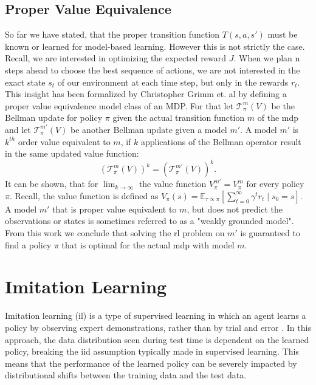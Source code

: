 \subsection{Proper Value Equivalence}
\label{sec:prop_val_eq}
So far we have stated, that the proper transition function $T(s,a,s')$ must be known or learned for model-based learning. However this is not strictly the case. Recall, we are 
interested in optimizing the expected reward $J$. When we plan n steps ahead to choose the best sequence of actions, we are not interested in the exact state $s_t$ 
of our environment at each time step, but only in the rewards $r_t$. \\
This insight has been formalized by Christopher Grimm et. al \cite{grimm2021proper} by defining a proper value equivalence model class of an MDP. For that 
let $\mathcal{T}^m_{\pi}(V)$ be the Bellman update for policy $\pi$ given the actual transition function $m$ of the \ac{mdp} and let 
$\mathcal{T}^{m'}_{\pi}(V)$ be another Bellman update given a model $m'$. A model $m'$ is $k^{th}$ order value equivalent to $m$, 
if $k$ applications of the Bellman operator result in the same updated value function: 
\begin{equation}
    \label{eq_kthVE}
    \left(\mathcal{T}^{m}_{\pi}(V)\right)^k = \left(\mathcal{T}^{m'}_{\pi}(V)\right)^k.
\end{equation}
It can be shown, that for $\lim_{k \rightarrow \infty}$ the value function $V_{\pi}^{m'} = V_{\pi}^m$ for every policy $\pi$. Recall, the value function is 
defined as $V_{\pi}(s) = \mathbb{E}_{\tau \propto \pi}\left[\sum_{t=0}^{\infty} \gamma^t r_t \mid s_0 = s\right]$. A model $m'$ that is proper value 
equivalent to $m$, but does not predict the observations or states is sometimes referred to as a "weakly grounded model".\\ 
From this work we conclude that solving the 
\ac{rl} problem on $m'$ is guaranteed to find a policy $\pi$ that is optimal for the actual \ac{mdp} with model $m$. 

\section{Imitation Learning}
Imitation learning (\ac{il}) is a type of supervised learning in which an agent learns a policy by observing expert demonstrations, 
rather than by trial and error \cite{IL}. In this approach, the data distribution seen during test time is dependent on the learned policy, 
breaking the \ac{iid} assumption typically made in supervised learning. This means that the performance of the 
learned policy can be severely impacted by distributional shifts between the training data and the test data. \\ \\

